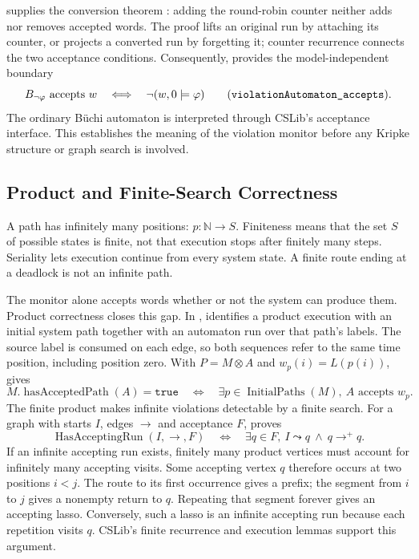  supplies the conversion theorem
: adding the round-robin counter neither adds
nor removes accepted words.  The proof lifts an original
run by attaching its counter, or projects a converted run by forgetting it;
counter recurrence connects the two acceptance conditions.  Consequently,
 provides the model-independent boundary
\[
  B_{\lnot\varphi}\text{ accepts }w
  \quad\Longleftrightarrow\quad \neg(w,0\models\varphi)
  \qquad\text{(\lean{violationAutomaton_accepts}).}
\]
The ordinary B\"uchi automaton is interpreted through CSLib's acceptance
interface.  This establishes the meaning of the violation monitor before any
Kripke structure or graph search is involved.

\subsection{Product and Finite-Search Correctness}

A path has infinitely many positions: $p:\mathbb{N}\to S$.  Finiteness means
that the set $S$ of possible states is finite, not that execution stops after
finitely many steps.  Seriality lets execution continue from every system
state.  A finite route ending at a deadlock is not an infinite path.

The monitor alone accepts words whether or not the system can produce them.
Product correctness closes this gap.  In ,
 identifies a product execution with an initial system
path together with an automaton run over that path's labels.  The source
label is consumed on each edge, so both sequences refer to the same time
position, including position zero.  With $P=M\otimes A$ and $w_p(i)=L(p(i))$,
 gives
\[
  M.\operatorname{hasAcceptedPath}(A)=\mathtt{true}
  \quad\Longleftrightarrow\quad
  \exists p\in\operatorname{InitialPaths}(M),\ A\text{ accepts }w_p.
\]
The finite product makes infinite violations detectable by a finite search.
For a graph with starts $I$, edges $\to$ and acceptance $F$,
 proves
\[
  \operatorname{HasAcceptingRun}(I,\to,F)
  \quad\Longleftrightarrow\quad
  \exists q\in F,\ I\leadsto q\ \land\ q\to^{+}q.
\]
If an infinite accepting run exists, finitely many product vertices must
account for infinitely many accepting visits.  Some accepting vertex $q$
therefore occurs at two positions $i<j$.  The route to its first occurrence
gives a prefix; the segment from $i$ to $j$ gives a nonempty return to $q$.
Repeating that segment forever gives an accepting lasso.  Conversely, such a
lasso is an infinite accepting run because each repetition visits $q$.
CSLib's finite recurrence and execution lemmas support this argument.

